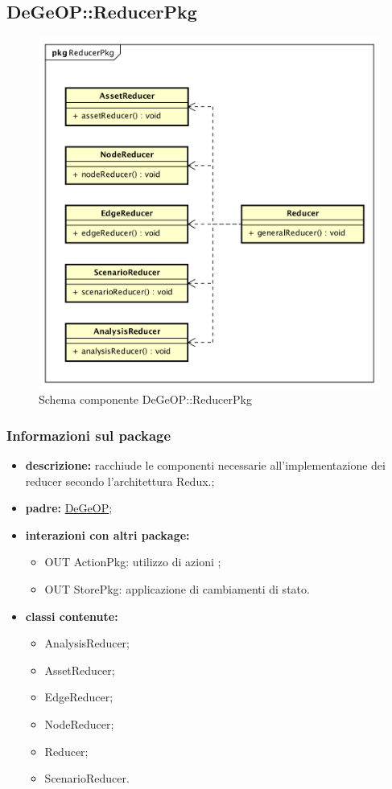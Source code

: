 \subsection{DeGeOP::ReducerPkg}
\label{pkg::ReducerPkg}
\begin{figure}[H]
	\centering
	\includegraphics[width=\textwidth]{img/PkgDiagram/ReducerPkg.png}
	\caption{Schema componente DeGeOP::ReducerPkg}
\end{figure}
\subsubsection{Informazioni sul package}
\begin{itemize}
	\item \textbf{descrizione:} racchiude le componenti necessarie all'implementazione dei reducer secondo l'architettura Redux.;
	\item \textbf{padre:} \hyperref[pkg::DeGeOP]{DeGeOP};
	\item \textbf{interazioni con altri package:} 
	\begin{itemize}
		\item OUT ActionPkg: utilizzo di azioni ;
		\item OUT StorePkg: applicazione di cambiamenti di stato.
	\end{itemize}
	\item \textbf{classi contenute:}
	\begin{itemize}
		\item AnalysisReducer;
		\item AssetReducer;
		\item EdgeReducer;
		\item NodeReducer;
		\item Reducer;
		\item ScenarioReducer.
	\end{itemize}
\end{itemize}
